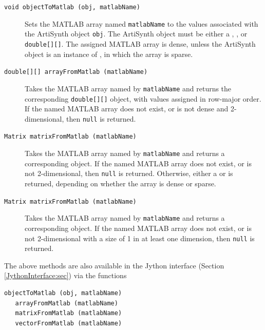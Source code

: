 \documentclass{article}
\begin{document}
\begin{description}

\item[{\tt void objectToMatlab (obj, matlabName)} ] \mbox{}

Sets the MATLAB array named {\tt matlabName} to the values associated
with the ArtiSynth object {\tt obj}. The ArtiSynth object must be
either a ,
, or {\tt double[][]}.  The assigned MATLAB
array is dense, unless the ArtiSynth object is an instance of
, in which the array
is sparse.

\item[{\tt double[][] arrayFromMatlab (matlabName)} ] \mbox{}

Takes the MATLAB array named by {\tt matlabName} and returns the
corresponding {\tt double[][]} object, with values assigned in
row-major order. If the named MATLAB array does not exist, or is not
dense and 2-dimensional, then {\tt null} is returned.

\item[{\tt Matrix matrixFromMatlab (matlabName)} ] \mbox{}

Takes the MATLAB array named by {\tt matlabName} and returns a
corresponding  object.  If the named
MATLAB array does not exist, or is not 2-dimensional, then {\tt null}
is returned. Otherwise, either a 
or  is returned, depending
on whether the array is dense or sparse.

\item[{\tt Matrix matrixFromMatlab (matlabName)} ] \mbox{}

Takes the MATLAB array named by {\tt matlabName} and returns a
corresponding  object.  If the
named MATLAB array does not exist, or is not 2-dimensional with a size
of 1 in at least one dimension, then {\tt null} is returned.

\end{description}

The above methods are also available in the Jython interface (Section
\ref{JythonInterface:sec}) via the functions
%
\begin{lstlisting}[]
   objectToMatlab (obj, matlabName)
   arrayFromMatlab (matlabName)
   matrixFromMatlab (matlabName)
   vectorFromMatlab (matlabName)
\end{lstlisting}
%
\end{document}
